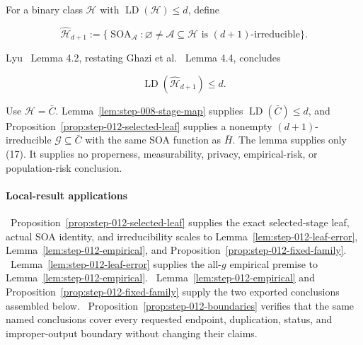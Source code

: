 For a binary class \(\mathcal H\) with
\(\operatorname{LD}(\mathcal H)\le d\), define

\[
 \widehat{\mathcal H}_{d+1}
 :=\{\operatorname{SOA}_{\mathcal A}:
       \varnothing\ne\mathcal A\subseteq\mathcal H
       \text{ is }(d+1)\text{-irreducible}\}.
\tag{16}
\]

Lyu~\citep{lyu2025} Lemma 4.2, restating Ghazi et al.~\citep{ghazi2020} Lemma 4.4, concludes

\[
 \operatorname{LD}(\widehat{\mathcal H}_{d+1})\le d.
\tag{17}
\]

Use \(\mathcal H=\bar C\). Lemma~\ref{lem:step-008-stage-map} supplies
\(\operatorname{LD}(\bar C)\le d\), and
Proposition~\ref{prop:step-012-selected-leaf} supplies a nonempty
\((d+1)\)-irreducible \(\mathcal G\subseteq\bar C\) with the same SOA
function as \(\bar H\). The lemma supplies only (17). It supplies no
properness, measurability, privacy, empirical-risk, or population-risk
conclusion.

\paragraph{Local-result applications}

\noindent\textbullet\ Proposition~\ref{prop:step-012-selected-leaf} supplies the exact
  selected-stage leaf, actual SOA identity, and irreducibility scales to
  Lemma~\ref{lem:step-012-leaf-error},
  Lemma~\ref{lem:step-012-empirical}, and
  Proposition~\ref{prop:step-012-fixed-family}.
\noindent\textbullet\ Lemma~\ref{lem:step-012-leaf-error} supplies the all-\(g\) empirical
  premise to Lemma~\ref{lem:step-012-empirical}.
\noindent\textbullet\ Lemma~\ref{lem:step-012-empirical} and
  Proposition~\ref{prop:step-012-fixed-family} supply the two exported
  conclusions assembled below.
\noindent\textbullet\ Proposition~\ref{prop:step-012-boundaries} verifies that the same named
  conclusions cover every requested endpoint, duplication, status, and
  improper-output boundary without changing their claims.



